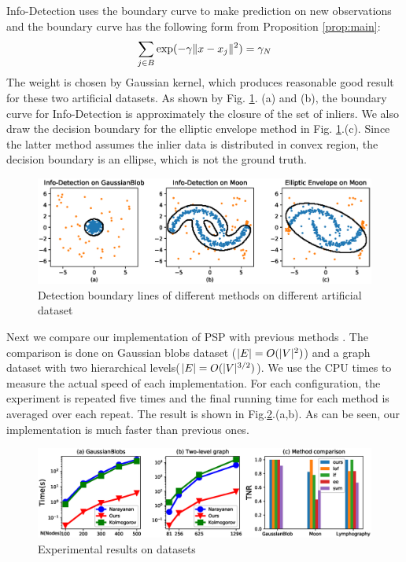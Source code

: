 \documentclass[runningheads]{llncs}
\begin{document}
Info-Detection uses the boundary curve to make prediction on new observations and the boundary curve has the following form from Proposition \ref{prop:main}:
\begin{equation}
\sum_{j \in B} \exp(-\gamma \lVert x - x_j\rVert^2)= \gamma_N
\end{equation}
The weight is chosen by Gaussian kernel, which produces reasonable good result for these two artificial datasets. As shown by Fig. \ref{fig:boundary}. (a) and (b), the boundary curve for Info-Detection is approximately the closure of the set of inliers. We also draw the decision boundary for the elliptic envelope method in Fig. \ref{fig:boundary}.(c). Since the latter method assumes the inlier data is distributed in convex region, the decision boundary is an ellipse, which is not the ground truth.
\begin{figure}[!ht]
	\centering
	\includegraphics[width=\textwidth]{pic/outlier_boundary_illustration.eps}
	\caption{Detection boundary lines of different methods on different artificial dataset}	\label{fig:boundary}
\end{figure}

Next we compare our implementation of PSP with previous methods \cite{RN3,RN4}. The comparison is done on Gaussian blobs dataset ($\lvert E\rvert=O(\lvert V\rvert^2)$) and a graph dataset with two hierarchical levels($\lvert E\rvert=O(\lvert V\rvert^{3/2})$). We use the CPU times to measure the actual speed of each implementation. For each configuration, the experiment is repeated five times and the final running time for each method is averaged over each repeat.  The result is shown in Fig.\ref{fig:er}.(a,b). As can be seen, our implementation is much faster than previous ones.

\begin{figure}[!ht]
\centering
\includegraphics[width=\textwidth]{pic/experimental_results_triple.eps}
\caption{Experimental results on datasets}\label{fig:er}
\end{figure}
\end{document}
